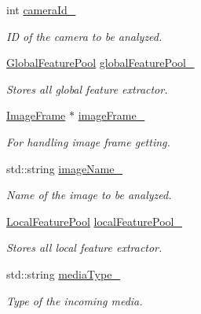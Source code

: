 \begin{DoxyCompactItemize}
\item 
int \hyperlink{group___object_recognition_ab1c035063117de9d0b865066d877e11a}{camera\-Id\-\_\-}
\begin{DoxyCompactList}\small\item\em I\-D of the camera to be analyzed. \end{DoxyCompactList}\item 
\hyperlink{_huro_algorithm_8h_ad4309d5d691431863fc5ec3e055ff4be}{Global\-Feature\-Pool} \hyperlink{group___object_recognition_a764b3c6f64d2cbcc7062359593c097d4}{global\-Feature\-Pool\-\_\-}
\begin{DoxyCompactList}\small\item\em Stores all global feature extractor. \end{DoxyCompactList}\item 
\hyperlink{group___core_class_image_frame}{Image\-Frame} $\ast$ \hyperlink{group___object_recognition_ae03bda7ba79c469b7f36566fe354f93a}{image\-Frame\-\_\-}
\begin{DoxyCompactList}\small\item\em For handling image frame getting. \end{DoxyCompactList}\item 
std\-::string \hyperlink{group___object_recognition_a2a752aeadf9fd6552473b42c2c3e6851}{image\-Name\-\_\-}
\begin{DoxyCompactList}\small\item\em Name of the image to be analyzed. \end{DoxyCompactList}\item 
\hyperlink{_huro_algorithm_8h_abe9af98b49248cef7bcdd2ef41993b26}{Local\-Feature\-Pool} \hyperlink{group___object_recognition_a71f5e4605425060593f8ec4ce2381698}{local\-Feature\-Pool\-\_\-}
\begin{DoxyCompactList}\small\item\em Stores all local feature extractor. \end{DoxyCompactList}\item 
std\-::string \hyperlink{group___object_recognition_a433b1ef87e917a1cdedc519dcc494837}{media\-Type\-\_\-}
\begin{DoxyCompactList}\small\item\em Type of the incoming media. \end{DoxyCompactList}\end{DoxyCompactItemize}


